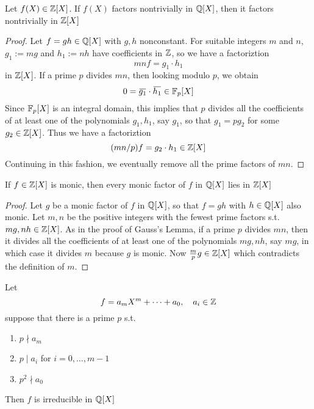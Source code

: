 \documentclass[11pt]{article}
\begin{document}
\begin{proposition}
Let \(f(X)\in\mathbb{Z}[X]\). If \(f(X)\) factors nontrivially in \(\mathbb{Q}[X]\), then it factors nontrivially in \(\mathbb{Z}[X]\)
\end{proposition}

\begin{proof}
Let \(f=gh\in\mathbb{Q}[X]\) with \(g,h\) nonconstant. For suitable integers \(m\) and \(n\), \(g_1:=mg\)
and \(h_1:=nh\) have coefficients in \(\mathbb{Z}\), so we have a factoriztion
\begin{equation*}
mnf=g_1\cdot h_1
\end{equation*}
in \(\mathbb{Z}[X]\). If a prime \(p\) divides \(mn\), then looking modulo \(p\), we obtain
\begin{equation*}
0=\bbar{g_1}\cdot\bbar{h_1}\in\F_p[X]
\end{equation*}
Since \(\mathbb{F}_p[X]\) is an integral domain, this implies that \(p\) divides all the coefficients of
at least one of the polynomials \(g_1,h_1\), say \(g_1\), so that \(g_1=pg_2\) for some \(g_2\in\mathbb{Z}[X]\).
Thus we have a factoriztion
\begin{equation*}
(mn/p)f=g_2\cdot h_1\in\mathbb{Z}[X]
\end{equation*}
Continuing in this fashion, we eventually remove all the prime factors of \(mn\).
\end{proof}

\begin{proposition}[]
If \(f\in\mathbb{Z}[X]\) is monic, then every monic factor of \(f\) in \(\mathbb{Q}[X]\) lies in \(\mathbb{Z}[X]\)
\end{proposition}

\begin{proof}
Let \(g\) be a monic factor of \(f\) in \(\mathbb{Q}[X]\), so that \(f=gh\) with \(h\in\mathbb{Q}[X]\) also monic.
Let \(m,n\) be the positive integers with the fewest prime factors s.t. \(mg,nh\in\mathbb{Z}[X]\). As in
the proof of Gauss's Lemma, if a prime \(p\) divides \(mn\), then it divides all the
coefficients of at least one of the polynomials \(mg,nh\), say \(mg\), in which case it
divides \(m\) because \(g\) is monic. Now \(\frac{m}{p}g\in\mathbb{Z}[X]\) which contradicts the definition
of \(m\).
\end{proof}

\begin{proposition}
Let
\begin{equation*}
f=a_mX^m+\dots+a_0,\quad a_i\in\mathbb{Z}
\end{equation*}
suppose that there is a prime \(p\) s.t.
\begin{enumerate}
\item \(p\nmid a_m\)
\item \(p\mid a_i\)  for \(i=0,\dots,m-1\)
\item \(p^2\nmid a_0\)
\end{enumerate}


Then \(f\) is irreducible in \(\mathbb{Q}[X]\)
\end{proposition}
\end{document}
